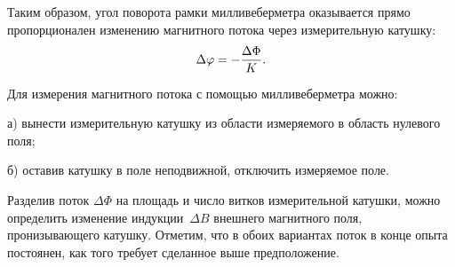 \begin{labsupplement}
Таким образом, угол поворота рамки милливеберметра оказывается прямо пропорционален 
изменению магнитного потока через измерительную катушку:
\begin{equation}
\Delta \varphi=-\frac{\Delta \Phi}{K} .
\eqmark{MWB.9}
\end{equation}

Для измерения магнитного потока с помощью милливеберметра можно:

а) вынести измерительную катушку из области измеряемого в область нулевого поля;

б) оставив катушку в поле неподвижной, отключить измеряемое поле.

Разделив поток $\Delta \Phi$ на площадь и число витков измерительной катушки, 
можно определить изменение индукции~$\Delta B$ внешнего магнитного поля,
пронизывающего катушку.
Отметим, что в обоих вариантах поток в конце опыта постоянен, как того
требует сделанное выше предположение.

\end{labsupplement}


